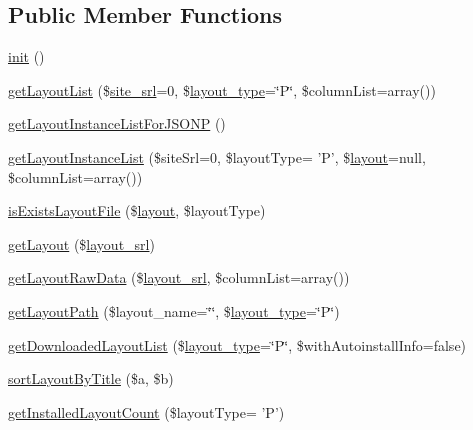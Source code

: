 \subsection*{Public Member Functions}
\begin{DoxyCompactItemize}
\item 
\hyperlink{classlayoutModel_a0e38b226e6c6f4ceae728725e40178fd}{init} ()
\item 
\hyperlink{classlayoutModel_afc353a7801c6cd15af3822e6fdac9ba2}{get\-Layout\-List} (\$\hyperlink{ko_8install_8php_a8b1406b4ad1048041558dce6bfe89004}{site\-\_\-srl}=0, \$\hyperlink{ko_8install_8php_a0532d89570cfdaebc628afac2ff5a81b}{layout\-\_\-type}=\char`\"{}P\char`\"{}, \$column\-List=array())
\item 
\hyperlink{classlayoutModel_a8093366d9ab2988d5ae6d51856752f91}{get\-Layout\-Instance\-List\-For\-J\-S\-O\-N\-P} ()
\item 
\hyperlink{classlayoutModel_a4cd0c42496b7529d53835669eb4798c5}{get\-Layout\-Instance\-List} (\$site\-Srl=0, \$layout\-Type= 'P', \$\hyperlink{classlayout}{layout}=null, \$column\-List=array())
\item 
\hyperlink{classlayoutModel_aad01da0a48d593382de1d46df2c6d2c2}{is\-Exists\-Layout\-File} (\$\hyperlink{classlayout}{layout}, \$layout\-Type)
\item 
\hyperlink{classlayoutModel_a46f845328e6b65e772408ceb990adb6b}{get\-Layout} (\$\hyperlink{ko_8install_8php_a70054876db09b2519a1726663c8dd9e7}{layout\-\_\-srl})
\item 
\hyperlink{classlayoutModel_a008cf11689e020eb48ac719eb33979a6}{get\-Layout\-Raw\-Data} (\$\hyperlink{ko_8install_8php_a70054876db09b2519a1726663c8dd9e7}{layout\-\_\-srl}, \$column\-List=array())
\item 
\hyperlink{classlayoutModel_a78119afb7cf8bf74aee4f1a093f74dc5}{get\-Layout\-Path} (\$layout\-\_\-name=\char`\"{}\char`\"{}, \$\hyperlink{ko_8install_8php_a0532d89570cfdaebc628afac2ff5a81b}{layout\-\_\-type}=\char`\"{}P\char`\"{})
\item 
\hyperlink{classlayoutModel_aed10488985735bd1adda014388b3a781}{get\-Downloaded\-Layout\-List} (\$\hyperlink{ko_8install_8php_a0532d89570cfdaebc628afac2ff5a81b}{layout\-\_\-type}=\char`\"{}P\char`\"{}, \$with\-Autoinstall\-Info=false)
\item 
\hyperlink{classlayoutModel_a2fe5cbdc4be434f56cc1fed03588d1f4}{sort\-Layout\-By\-Title} (\$a, \$b)
\item 
\hyperlink{classlayoutModel_a0d0b74697a88270380a7f7afac1af96b}{get\-Installed\-Layout\-Count} (\$layout\-Type= 'P')

\end{DoxyCompactItemize}
